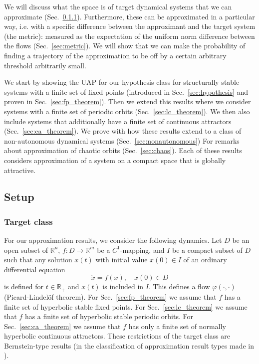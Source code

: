 \documentclass{article}
\theoremstyle{definition} \newtheorem{definition}{Definition}
\theoremstyle{remark} \newtheorem{remark}{Remark}
\newcommand{\reals}{\mathbb{R}}
\newcounter{ct}
\begin{document}

We will discuss what the space is of target dynamical systems that we can approximate (Sec.~\ref{sec:target}).
Furthermore, these can be approximated in a particular way, i.e. with a specific difference between the approximant and the target system (the metric): measured as the expectation of the uniform norm difference between the flows (Sec.~\ref{sec:metric}). 
We will show that we can make the probability of finding a trajectory of the approximation to be off by a certain arbitrary threshold arbitrarily small. 

We start by showing the UAP for our hypothesis class for structurally stable systems with a finite set of fixed points  (introduced in Sec.~\ref{sec:hypothesis} and proven in Sec.~\ref{sec:fp_theorem}).
Then we extend this results where we consider systems with a finite set of periodic orbits (Sec.~\ref{sec:lc_theorem}).
We then also include systems that additionally have a finite set of continuous attractors (Sec.~\ref{sec:ca_theorem}).
We prove with how these results extend to a class of non-autonomous dynamical systems (Sec.~\ref{sec:nonautonomous}) 
For remarks about approximation of chaotic orbits (Sec.~\ref{sec:chaos}).
Each of these results considers approximation of a system on a compact space that is globally attractive. %


\subsection{Setup}
\subsubsection{Target class}\label{sec:target}
For our approximation results, we consider the following dynamics.
Let $D$ be an open subset of $\mathbb{R}^n$,
 $f\colon D \to \mathbb{R}^m$ be a $C^1$-mapping,
  and $I$ be a compact subset of $D$ such that any solution $x(t)$ with initial value $x(0) \in I$ of an ordinary differential equation
\begin{equation}\label{eq:5}
    \dot{x} = f(x), \quad x(0) \in D
\end{equation}
is defined for $t\in\reals_{+}$ and $x(t)$ is included in $I$.
This defines a flow $\varphi(\cdot, \cdot)$ (Picard-Lindel\"of theorem).
For Sec.~\ref{sec:fp_theorem} we assume that $f$ has  a finite set of hyperbolic stable fixed points.
For Sec.~\ref{sec:lc_theorem} we assume that $f$ has  a finite set of hyperbolic stable periodic orbits.
For Sec.~\ref{sec:ca_theorem} we assume that $f$ has only a finite set of normally hyperbolic continuous attractors.
%
These restrictions of the target class are Bernstein-type results (in the classification of approximation result types made in \citep{jiang2023brief}).
\end{document}
